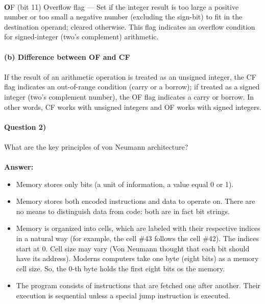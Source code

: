 \documentclass[11pt, a4paper]{amsart}
\numberwithin{equation}{section}
\theoremstyle{plain} %
\theoremstyle{definition}
\theoremstyle{remark}
\begin{document}
\\
\textbf{O}F (bit 11) Overflow flag — Set if the integer result is too large a positive number or too small a negative number (excluding the sign-bit) to fit in the destination operand; cleared otherwise. This flag indicates an overflow condition for signed-integer (two’s complement) arithmetic.\\
\\
\textbf{(b) Difference between OF and CF}\\
\\
If the result of an arithmetic operation is treated as an unsigned integer, the CF flag indicates an out-of-range condition (carry or a borrow); if treated as a signed integer (two’s complement number), the OF flag indicates a carry or borrow. In other words, CF works with unsigned integers and OF works with signed integers.\\
\\
\textbf{Question 2)}\\
\\
What are the key principles of von Neumann architecture?\\
\\
\textbf{Answer:}\\
\begin{itemize}
    \item Memory stores only bits (a unit of information, a value equal 0 or 1).
    \item Memory stores both encoded instructions and data to operate on. There are no means to distinguish data from code: both are in fact bit strings.
    \item Memory is organized into cells, which are labeled with their respective indices in a natural way (for example, the cell \#43 follows the cell \#42). The indices start at 0. Cell size may vary (Von Neumann thought that each bit should have its address). Moderns computers take one byte (eight bits) as a memory cell size. So, the 0-th byte holds the first eight bits os the memory.
    \item The program consists of instructions that are fetched one after another. Their execution is sequential unless a special jump instruction is executed.
\end{itemize}





\begin{bibdiv}
        \begin{biblist}
        \end{biblist}
    \end{bibdiv}
\end{document}
